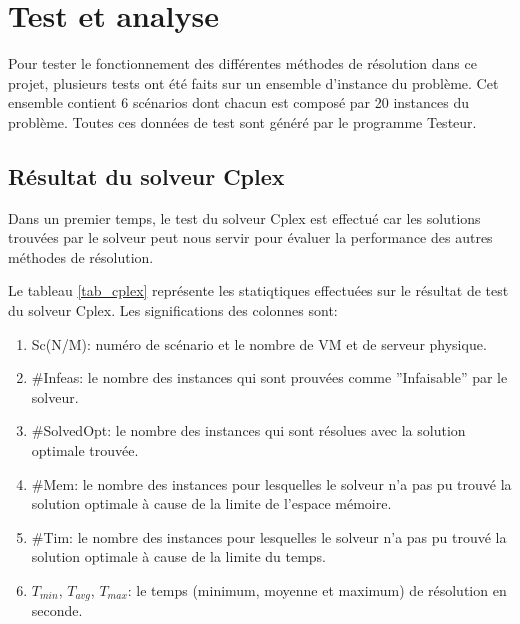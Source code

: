 \documentclass[twoside,fleqn]{EPURapport}
\begin{document}
%
%
%
%
%





\chapter{Test et analyse}
Pour tester le fonctionnement des différentes méthodes de résolution dans ce projet, plusieurs tests ont été faits sur un ensemble d'instance du problème. Cet ensemble contient 6 scénarios dont chacun est composé par 20 instances du problème. Toutes ces données de test sont généré par le programme Testeur.

\section{Résultat du solveur Cplex}
Dans un premier temps, le test du solveur Cplex est effectué car les solutions trouvées par le solveur peut nous servir pour évaluer la performance des autres méthodes de résolution.

 
Le tableau \ref{tab_cplex} représente les statiqtiques effectuées sur le résultat de test du solveur Cplex. Les significations des colonnes sont:
\begin{enumerate}
	\item Sc(N/M): numéro de scénario et le nombre de VM et de serveur physique.
	\item \#Infeas: le nombre des instances qui sont prouvées comme ''Infaisable'' par le solveur.
	\item \#SolvedOpt: le nombre des instances qui sont résolues avec la solution optimale trouvée.
	\item \#Mem: le nombre des instances pour lesquelles le solveur n'a pas pu trouvé la solution optimale à cause de la limite de l'espace mémoire.
	\item \#Tim: le nombre des instances pour lesquelles le solveur n'a pas pu trouvé la solution optimale à cause de la limite du temps.
	\item $T_{min}$, $T_{avg}$, $T_{max}$: le temps (minimum, moyenne et maximum) de résolution en seconde.
\end{enumerate}
\bigskip
\end{document}
